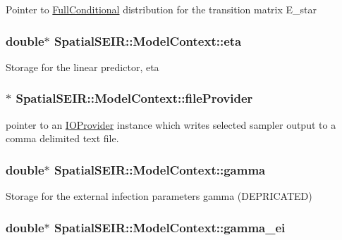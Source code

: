Pointer to \hyperlink{classSpatialSEIR_1_1FullConditional}{Full\-Conditional} distribution for the transition matrix E\-\_\-star \hypertarget{classSpatialSEIR_1_1ModelContext_aeecc346cd62bc2c8a816b1451b5da64b}{
\subsubsection[{eta}]{\setlength{\rightskip}{0pt plus 5cm}double$\ast$ Spatial\-S\-E\-I\-R\-::\-Model\-Context\-::eta}}\label{classSpatialSEIR_1_1ModelContext_aeecc346cd62bc2c8a816b1451b5da64b}
Storage for the linear predictor, eta \hypertarget{classSpatialSEIR_1_1ModelContext_a388cbd8cccf85afc2ffee74f008e63e0}{
\subsubsection[{file\-Provider}]{$\ast$ Spatial\-S\-E\-I\-R\-::\-Model\-Context\-::file\-Provider}}\label{classSpatialSEIR_1_1ModelContext_a388cbd8cccf85afc2ffee74f008e63e0}
pointer to an \hyperlink{classSpatialSEIR_1_1IOProvider}{I\-O\-Provider} instance which writes selected sampler output to a comma delimited text file. \hypertarget{classSpatialSEIR_1_1ModelContext_a4e545262577a97dd3aceeefc2a956626}{
\subsubsection[{gamma}]{\setlength{\rightskip}{0pt plus 5cm}double$\ast$ Spatial\-S\-E\-I\-R\-::\-Model\-Context\-::gamma}}\label{classSpatialSEIR_1_1ModelContext_a4e545262577a97dd3aceeefc2a956626}
Storage for the external infection parameters gamma (D\-E\-P\-R\-I\-C\-A\-T\-E\-D) \hypertarget{classSpatialSEIR_1_1ModelContext_a72509958c44ad6153feff07ec3da9895}{
\subsubsection[{gamma\-\_\-ei}]{\setlength{\rightskip}{0pt plus 5cm}double$\ast$ Spatial\-S\-E\-I\-R\-::\-Model\-Context\-::gamma\-\_\-ei}}\label{classSpatialSEIR_1_1ModelContext_a72509958c44ad6153feff07ec3da9895}
